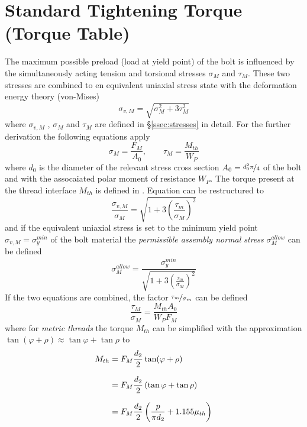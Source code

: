 \chapter{Standard Tightening Torque (Torque Table)}
The maximum possible preload (load at yield point) of the bolt is influenced by the simultaneously acting 
tension and torsional stresses $\sigma_M$ and $\tau_M$. These two stresses are combined to en equivalent 
uniaxial stress state with the deformation energy theory (von-Mises)
\begin{equation}
    \sigma_{v,M} = \sqrt{\sigma_M^2 + 3 \tau_M^2}
    \label{equ:sig_vM_2}
\end{equation}
where $\sigma_{v,M}$ , $\sigma_M$  and $\tau_M$  
are defined in §\ref{ssec:stresses} in detail. For the further derivation the following equations apply 
\begin{equation}
    \sigma_M = \frac{F_M}{A_0}, \qquad \tau_M = \frac{M_{th}}{W_P}
    \label{equ:sig_tau}
\end{equation}
where $d_0$ is the diameter of the relevant stress cross section $A_0=\nicefrac{d_0^2 \pi}{4}$ of the
bolt and with the assocaiated polar moment of resistance $W_P$. The torque present at the thread 
interface $M_{th}$ is defined in . Equation  can be restructured to
\begin{equation}
    \frac{\sigma_{v,M}}{\sigma_M} = \sqrt{1+3\left(\frac{\tau_m}{\sigma_M}\right)^2}
\end{equation}
and if the equivalent uniaxial stress is set to the minimum yield point $\sigma_{v,M}=\sigma_y^{min}$ 
of the bolt material the \emph{permissible assembly normal stress} $\sigma_M^{allow}$ can be defined
\begin{equation}
    \sigma_M^{allow} = \frac{\sigma_y^{min}}{\sqrt{1+3\left(\frac{\tau_m}{\sigma_M}\right)^2}}
\end{equation}
If the two equations  are combined, the factor $\nicefrac{\tau_m}{\sigma_m}$ can be defined 
\begin{equation}
    \frac{\tau_M}{\sigma_M} = \frac{M_{th} A_0}{W_P F_M}
\end{equation}
where for \emph{metric threads} the torque $M_{th}$ can be simplified with the approximation 
$\tan(\varphi + \rho) \approx \tan\varphi + \tan\rho$ to
\begin{subequations}
    \setlength{\jot}{10pt}
    \begin{align}
        M_{th} &= F_M \frac{d_2}{2} \tan(\varphi+\rho) \\
        &= F_M \frac{d_2}{2} \left( \tan\varphi + \tan\rho \right) \\
        &= F_M \frac{d_2}{2} \left( \frac{p}{\pi d_2} + 1.155 \mu_{th} \right)
    \end{align}
\end{subequations}
